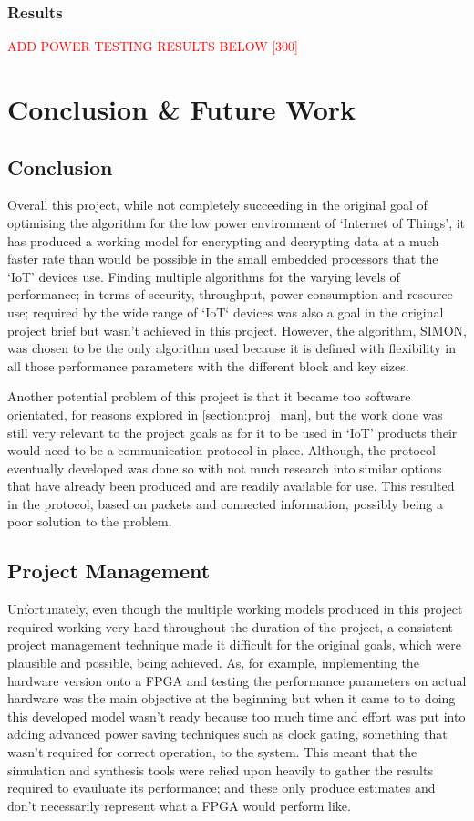 \documentclass[12pt,twoside,a4paper]{report}
\begin{document}
	\subsection{Results}
	\textcolor{red}{ADD POWER TESTING RESULTS BELOW [300]}

	\chapter{Conclusion \& Future Work}
	\label{chapter:CONC}
	
	\section{Conclusion}
	Overall this project, while not completely succeeding in the original goal of optimising the algorithm for the low power environment of `Internet of Things', it has produced a working model for encrypting and decrypting data at a much faster rate than would be possible in the small embedded processors that the `IoT' devices use. Finding multiple algorithms for the varying levels of performance; in terms of security, throughput, power consumption and resource use; required by the wide range of `IoT` devices was also a goal in the original project brief but wasn't achieved in this project. However, the algorithm, SIMON,  was chosen to be the only algorithm used because it is defined with flexibility in all those performance parameters with the different block and key sizes. 
	
	Another potential problem of this project is that it became too software orientated, for reasons explored in \autoref{section:proj_man}, but the work done was still very relevant to the project goals as for it to be used in `IoT' products their would need to be a communication protocol in place. Although, the protocol eventually developed was done so with not much research into similar options that have already been produced and are readily available for use. This resulted in the protocol, based on packets and connected information, possibly being a poor solution to the problem.
	
	\section{Project Management}
	\label{section:proj_man}
	Unfortunately, even though the multiple working models produced in this project required working very hard throughout the duration of the project, a consistent project management technique made it difficult for the original goals, which were plausible and possible, being achieved. As, for example, implementing the hardware version onto a FPGA and testing the performance parameters on actual hardware was the main objective at the beginning but when it came to to doing this developed model wasn't ready because too much time and effort was put into adding advanced power saving techniques such as clock gating, something that wasn't required for correct operation, to the system. This meant that the simulation and synthesis tools were relied upon heavily to gather the results required to evauluate its performance; and these only produce estimates and don't necessarily represent what a FPGA would perform like.
	
\end{document}

